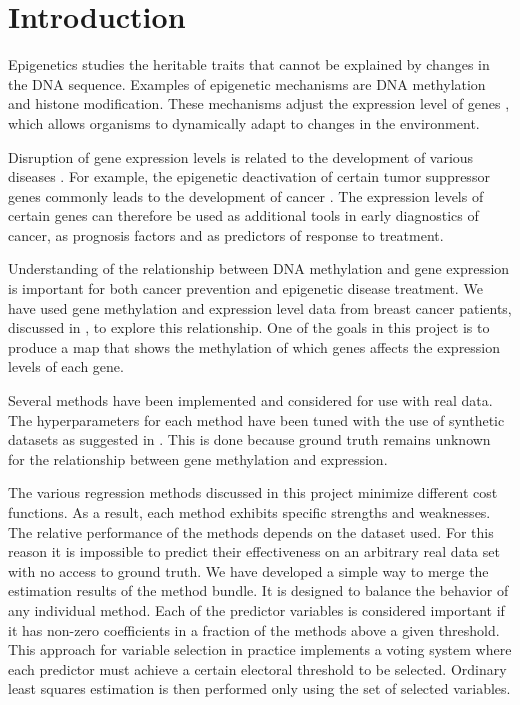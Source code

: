 \chapter{Introduction}
\setcounter{page}{1}
Epigenetics \cite{holliday2006epigenetics} studies the heritable traits that cannot be explained by changes in the DNA sequence. Examples of epigenetic mechanisms are DNA methylation and histone modification. These mechanisms adjust the expression level of genes \cite{jaenisch2003epigenetic}, which allows organisms to dynamically adapt to changes in the environment.

Disruption of gene expression levels is related to the development of various diseases \cite{egger2004epigenetics}. For example, the epigenetic deactivation of certain tumor suppressor genes commonly leads to the development of cancer \cite{esteller2008epigenetics}. The expression levels of certain genes can therefore be used as additional tools in early diagnostics of cancer, as prognosis factors and as predictors of response to treatment.

Understanding of the relationship between DNA methylation and gene expression is important for both cancer prevention and epigenetic disease treatment. We have used gene methylation and expression level data from breast cancer patients, discussed in \cite{cancer2012comprehensive}, to explore this relationship. One of the goals in this project is to produce a map that shows the methylation of which genes affects the expression levels of each gene.

Several methods \cite{tibshirani1996regression,zou2005regularization,li2008network,li2010variable,pan2010incorporating,luo2012two,kim2013network} have been implemented and considered for use with real data. The hyperparameters for each method have been tuned with the use of synthetic datasets as suggested in \cite{li2008network}. This is done because ground truth remains unknown for the relationship between gene methylation and expression.

The various regression methods discussed in this project minimize different cost functions. As a result, each method exhibits specific strengths and weaknesses. The relative performance of the methods depends on the dataset used. For this reason it is impossible to predict their effectiveness on an arbitrary real data set with no access to ground truth. We have developed a simple way to merge the estimation results of the method bundle. It is designed to balance the behavior of any individual method. Each of the predictor variables is considered important if it has non-zero coefficients in a fraction of the methods above a given threshold. This approach for variable selection in practice implements a voting system where each predictor must achieve a certain electoral threshold to be selected. Ordinary least squares estimation is then performed only using the set of selected variables.

